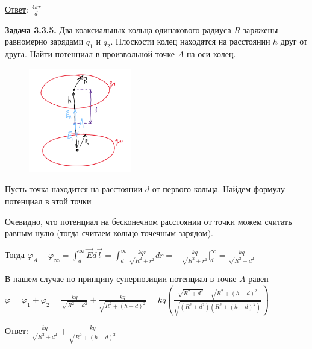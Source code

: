 \documentclass[12pt]{article}
\begin{document}
\bigvspace

\underline{Ответ}: $\frac{4k\tau}{d}$


\clearpage

\begin{tcolorbox}
    \textbf{Задача 3.3.5.} Два коаксиальных кольца одинакового радиуса $R$
    заряжены равномерно зарядами $q_1$ и $q_2$. Плоскости колец находятся
    на расстоянии $h$ друг от друга. Найти потенциал в произвольной
    точке $A$ на оси колец.
\end{tcolorbox}

\begin{minipage}{\textwidth}
    \begin{figure}
        \includegraphics[width=0.4\textwidth]{physics1/images/physics1_homework_7_2}
    \end{figure}

    Пусть точка находится на расстоянии $d$ от первого кольца. Найдем формулу потенциал в этой точки

    Очевидно, что потенциал на бесконечном расстоянии от точки можем считать равным нулю (тогда считаем кольцо точечным зарядом). 

    Тогда $\varphi_A - \varphi_\infty = \int_{d}^{\infty} \vec{E}d\vec{l} = \int_{d}^{\infty} \frac{kqr}{\sqrt{R^2 + r^2}} dr = 
    -\frac{kq}{\sqrt{R^2 + r^2}} \Big|_{d}^{\infty} = \frac{kq}{\sqrt{R^2 + d^2}}$

    В нашем случае по принципу суперпозиции потенциал в точке $A$ равен $\varphi = \varphi_1 + \varphi_2 = 
    \frac{kq}{\sqrt{R^2 + d^2}} + \frac{kq}{\sqrt{R^2 + (h - d)^2}} = 
    kq\left(\frac{\sqrt{R^2 + d^2} + \sqrt{R^2 + (h - d)^2}}{\sqrt{(R^2 + d^2)(R^2 + (h - d)^2)}}\right)$
\end{minipage}

\bigvspace

\underline{Ответ}: $\frac{kq}{\sqrt{R^2 + d^2}} + \frac{kq}{\sqrt{R^2 + (h - d)^2}}$

\clearpage
\end{document}
